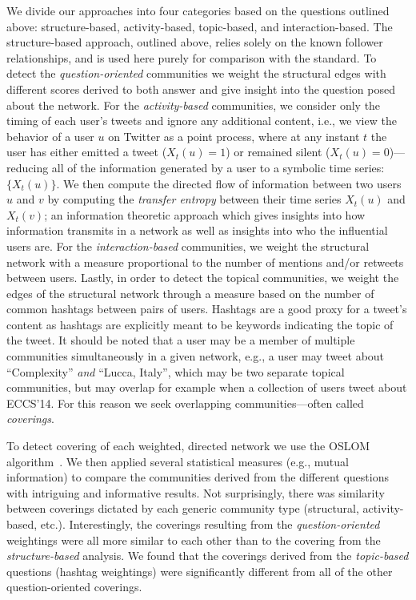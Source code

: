 \documentclass[10pt,a4paper]{article}
\begin{document}
We divide our approaches into four categories based on the questions outlined above: structure-based, activity-based, topic-based, and interaction-based. The structure-based approach, outlined above, relies solely on the known follower relationships, and is used here purely for comparison with the standard. To detect the \emph{question-oriented} communities we weight the structural edges with different scores derived to both answer and give insight into the question posed about the network. For the \emph{activity-based} communities, we consider only the timing of each user's tweets and ignore any additional content, i.e., we view the behavior of a user $u$ on Twitter as a point process, where at any instant $t$ the user has either emitted a tweet ($X_{t}(u) = 1$) or remained silent ($X_{t}(u) = 0$)---reducing all of the information generated by a user to a symbolic time series: $\{ X_{t}(u)\}$. We then compute the directed flow of information between two users $u$ and $v$ by computing the \emph{transfer entropy} between their time series $X_{t}(u)$ and $X_{t}(v)$; an information theoretic approach which gives insights into how information transmits in a network as well as insights into who the influential users are. For the \emph{interaction-based} communities, we weight the structural network with a measure proportional to the number of mentions and/or retweets between users. Lastly, in order to detect the topical communities, we weight the edges of the structural network through a measure based on the number of common hashtags between pairs of users. Hashtags are a good proxy for a tweet's content as hashtags are explicitly meant to be keywords indicating the topic of the tweet. It should be noted that a user may be a member of multiple communities simultaneously in a given network, e.g., a user may tweet about ``Complexity'' \emph{and} ``Lucca, Italy'', which may be two separate topical communities, but may overlap for example when a collection of users tweet about ECCS'14. For this reason we seek overlapping communities---often called \emph{coverings}.

To detect covering of each weighted, directed network we use the OSLOM algorithm~\cite{LancichinettiPlos}. We then applied several statistical measures (e.g., mutual information) to compare the communities derived from the different questions with intriguing and informative results.  Not surprisingly, there was similarity between coverings dictated by each generic community type (structural, activity-based, etc.).
Interestingly, the coverings resulting from the \emph{question-oriented} weightings were all more similar to each other than to the covering from the \emph{structure-based} analysis. We found that the coverings derived from the \emph{topic-based} questions (hashtag weightings) were significantly different from all of the other question-oriented coverings. 
\end{document}

